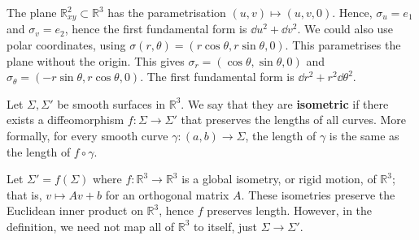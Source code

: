 \documentclass[a4paper]{article}
\begin{document}
\begin{example}
	The plane \( \mathbb R^2_{xy} \subset \mathbb R^3 \) has the parametrisation \( (u,v) \mapsto (u,v,0) \).
	Hence, \( \sigma_u = e_1 \) and \( \sigma_v = e_2 \), hence the first fundamental form is \( \dd{u}^2 + \dd{v}^2 \).
	We could also use polar coordinates, using \( \sigma(r,\theta) = (r\cos\theta,r\sin\theta,0) \).
	This parametrises the plane without the origin.
	This gives \( \sigma_r = (\cos\theta,\sin\theta,0) \) and \( \sigma_\theta = (-r\sin\theta, r\cos\theta,0) \).
	The first fundamental form is \( \dd{r}^2 + r^2 \dd{\theta}^2 \).
\end{example}
\begin{definition}
	Let \( \Sigma, \Sigma' \) be smooth surfaces in \( \mathbb R^3 \).
	We say that they are \textbf{isometric} if there exists a diffeomorphism \( f\colon \Sigma \to \Sigma' \) that preserves the lengths of all curves.
	More formally, for every smooth curve \( \gamma \colon (a,b) \to \Sigma \), the length of \( \gamma \) is the same as the length of \( f \circ \gamma \).
\end{definition}
\begin{example}
	Let \( \Sigma' = f(\Sigma) \) where \( f \colon \mathbb R^3 \to \mathbb R^3 \) is a global isometry, or rigid motion, of \( \mathbb R^3 \); that is, \( v \mapsto Av+b \) for an orthogonal matrix \( A \).
	These isometries preserve the Euclidean inner product on \( \mathbb R^3 \), hence \( f \) preserves length.
	However, in the definition, we need not map all of \( \mathbb R^3 \) to itself, just \( \Sigma \to \Sigma' \).
\end{example}
\end{document}
